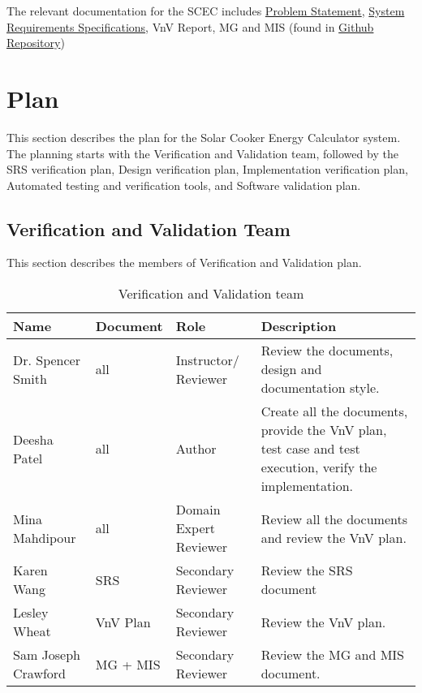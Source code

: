 \documentclass[12pt, titlepage]{article}
\begin{document}
The relevant documentation for the SCEC includes \href{https://github.com/DeeshaPatel/CAS-741-Solar-Cooker/blob/7c53c8d9a19ca2f94dfba6ba9208eae0bf03b8cc/docs/ProblemStatementAndGoals/ProblemStatement.pdf}{Problem Statement}, \href{https://github.com/DeeshaPatel/CAS-741-Solar-Cooker/blob/7c53c8d9a19ca2f94dfba6ba9208eae0bf03b8cc/docs/SRS/SRS.pdf}{System Requirements Specifications}, VnV Report, MG and MIS (found in \href{https://github.com/DeeshaPatel/CAS-741-Solar-Cooker/tree/main/docs}{Github Repository})  


\section{Plan}
\label{plan}

This section describes the plan for the Solar Cooker Energy Calculator system. The planning starts with the Verification and Validation team, followed by the SRS verification plan, Design verification plan, Implementation verification plan, Automated testing and verification tools, and Software validation plan.  

\subsection{Verification and Validation Team}

This section describes the members of Verification and Validation plan. 

\begin{center}
\begin{table}[h!]
\begin{tabular}{ |l|l|p{2cm}|p{5cm}| } 
\hline
\rowcolor[gray]{0.9}
\textbf{Name} & \textbf{Document} & \textbf{Role} & \textbf{Description} \\
\hline
 Dr. Spencer Smith & all & Instructor/ Reviewer & Review the documents, design and documentation style. \\ 
 \hline
 Deesha Patel & all & Author & Create all the documents, provide the VnV plan, test case and test execution, verify the implementation. \\  
 \hline
 Mina Mahdipour & all & Domain Expert Reviewer & Review all the documents and review the VnV plan. \\  
 \hline
 Karen Wang & SRS & Secondary Reviewer & Review the SRS document \\
 \hline
Lesley  Wheat & VnV Plan & Secondary Reviewer & Review the VnV plan. \\ 
\hline 
Sam Joseph Crawford & MG + MIS & Secondary Reviewer & Review the MG and MIS document. \\

\hline
\end{tabular}
\caption{Verification and Validation team} 
\end{table}
\end{center}
\end{document}
